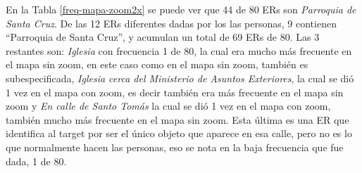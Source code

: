 En la Tabla \ref{freq-mapa-zoom2x} se puede ver que 44 de 80 ERs son {\it Parroquia de Santa Cruz}. De las 12 ERs diferentes dadas por los las personas, 9 contienen ``Parroquia de Santa Cruz'', y acumulan un total de 69 ERs de 80. Las 3 restantes son: {\it Iglesia} con frecuencia 1 de 80, la cual era mucho m\'as frecuente en el mapa sin zoom, en este caso como en el mapa sin zoom, tambi\'en es subespecificada, {\it Iglesia cerca del Ministerio de Asuntos Exteriores}, la cual se di\'o 1 vez en el mapa con zoom, es decir tambi\'en era m\'as frecuente en el mapa sin zoom y {\it En calle de Santo Tom\'as} la cual se di\'o 1 vez en el mapa con zoom, tambi\'en mucho m\'as frecuente en el mapa sin zoom. Esta \'ultima es una ER que identifica al target por ser el \'unico objeto que aparece en esa calle, pero no es lo que normalmente hacen las personas, eso se nota en la baja frecuencia que fue dada, 1 de 80.

